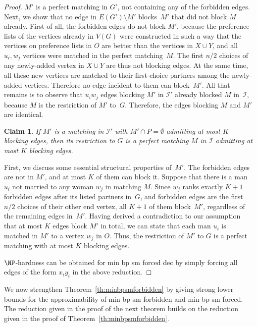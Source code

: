 \documentclass[preprint,12pt]{elsarticle}
\newtheorem{claim}[theorem]{Claim}
\begin{document}
\begin{proof}
		$M'$ is a perfect matching in $G'$, not containing any of the forbidden edges. Next, we show that no edge in $E(G') \setminus M'$ blocks~$M'$ that did not block $M$ already. First of all, the forbidden edges do not block $M'$, because the preference lists of the vertices already in $V(G)$ were constructed in such a way that the vertices on preference lists in $O$ are better than the vertices in $X\cup Y$, and all $u_i, w_j$ vertices were matched in the perfect matching~$M$. The first $n/2$ choices of any newly-added vertex in $X\cup Y$ are thus not blocking edges. At the same time, all these new vertices are matched to their first-choice partners among the newly-added vertices. Therefore no edge incident to them can block~$M'$. All that remains is to observe that $u_i w_j$ edges blocking $M'$ in $\mathcal{I'}$ already blocked $M$ in~$\mathcal{I}$, because $M$ is the restriction of $M'$ to~$G$. Therefore, the edges blocking $M$ and $M'$ are identical.
	
\begin{claim}
		If $M'$ is a matching in $\mathcal{I'}$ with $M' \cap P = \emptyset$ admitting at most $K$ blocking edges, then its restriction to $G$ is a perfect matching $M$ in $\mathcal{I}$ admitting at most $K$ blocking edges.
	\end{claim}
	
		First, we discuss some essential structural properties of~$M'$. The forbidden edges are not in $M'$, and at most $K$ of them can block it. Suppose that there is a man $u_i$ not married to any woman $w_j$ in matching $M$. Since $w_j$ ranks exactly $K + 1$ forbidden edges after its listed partners in~$G$, and forbidden edges are the first $n/2$ choices of their other end vertex, all $K + 1$ of them block~$M'$, regardless of the remaining edges in~$M'$. Having derived a contradiction to our assumption that at most $K$ edges block $M'$ in total, we can state that each man $u_i$ is matched in $M'$ to a vertex $w_j$ in $O$. Thus, the restriction of $M'$ to $G$ is a perfect matching with at most $K$ blocking edges.
		
		$\NP$-hardness can be obtained for {\sc min bp sm forced dec} by simply forcing all edges of the form $x_i y_i$ in the above reduction.
\end{proof}

We now strengthen Theorem~\ref{th:minbpsmforbidden} by giving strong lower bounds for the approximability of {\sc min bp sm forbidden} and {\sc min bp sm forced}.  The reduction given in the proof of the next theorem builds on the reduction given in the proof of Theorem~\ref{th:minbpsmforbidden}.
	
\end{document}
